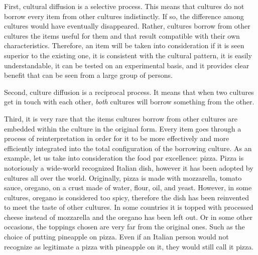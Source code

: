 \documentclass[../main.tex]{subfiles}
\begin{document}
First, cultural diffusion is a selective process. This means that cultures do not borrow every item from other cultures indistinctly. If so, the difference among cultures would have eventually disappeared. Rather, cultures borrow from other cultures the items useful for them and that result compatible with their own characteristics. Therefore, an item will be taken into consideration if it is seen superior to the existing one, it is consistent with the cultural pattern, it is easily understandable, it can be tested on an experimental basis, and it provides clear benefit that can be seen from a large group of persons.

Second, culture diffusion is a reciprocal process. It means that when two cultures get in touch with each other, \textit{both} cultures will borrow something from the other.

Third, it is very rare that the items cultures borrow from other cultures are embedded within the culture in the original form. Every item goes through a process of reinterpretation in order for it to be more effectively and more efficiently integrated into the total configuration of the borrowing culture. As an example, let us take into consideration the food par excellence: pizza. Pizza is notoriously a wide-world recognized Italian dish, however it has been adopted by cultures all over the world. Originally, pizza is made with mozzarella, tomato sauce, oregano, on a crust made of water, flour, oil, and yeast. However, in some cultures, oregano is considered too spicy, therefore the dish has been reinvented to meet the taste of other cultures. In some countries it is topped with processed cheese instead of mozzarella and the oregano has been left out. Or in some other occasions, the toppings chosen are very far from the original ones. Such as the choice of putting pineapple on pizza. Even if an Italian person would not recognize as legitimate a pizza with pineapple on it, they would still call it pizza.
\end{document}
